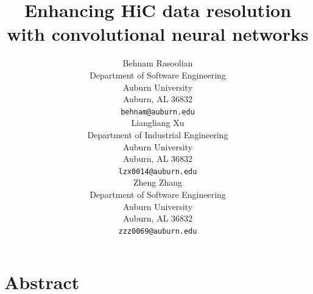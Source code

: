 \documentclass{article}
\begin{document}
\title{Enhancing HiC data resolution with convolutional neural networks}

\author{
    Behnam Rasoolian \\
    Department of Software Engineering \\
    Auburn University \\
    Auburn, AL 36832 \\
    \texttt{behnam@auburn.edu} \\
    \And
    Liangliang Xu \\
    Department of Industrial Engineering \\
    Auburn University \\
    Auburn, AL 36832 \\
    \texttt{lzx0014@auburn.edu} \\
    \And
    Zheng Zhang \\
    Department of Software Engineering \\
    Auburn University \\
    Auburn, AL 36832 \\
    \texttt{zzz0069@auburn.edu} \\
}

\maketitle
\section{Abstract}
\end{document}
